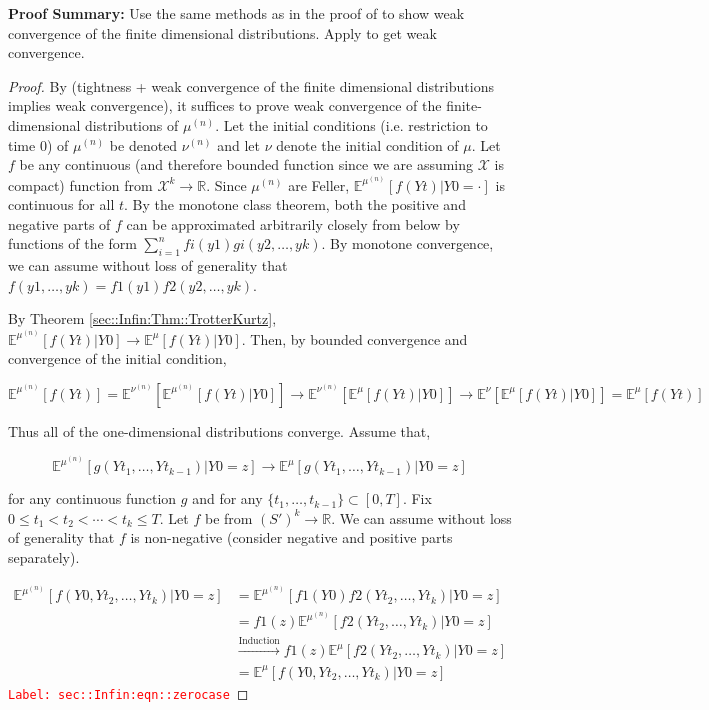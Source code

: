 \documentclass[12pt]{article}
\newcommand{\mb}{\mathbb}
\newcommand{\mc}{\mathcal}
\newcommand{\ra}{\rightarrow}
\newcommand{\os}{\overset}
\newcommand{\te}{\text}
\newcommand{\tr}{\textcolor{red}}
\newcommand{\labe}[1]{\tr{\texttt{Label: #1}}}
\newcommand{\pfsum}{\textbf{Proof Summary: }}
\newcommand{\ind}{\hspace{24pt}}
\newcommand{\exmu}[2]{\mb{E}^{#1}\left[#2\right]}	%
\renewcommand{\t}{t}							%
\newcommand{\sln}[1]{^{(#1)}}						%
\newcommand{\indx}[1]{_{#1}}					%
\newcommand{\m}{\mu}							%
\newcommand{\mm}{\nu}							%
\newcommand{\XX}{Y}								%
\renewcommand{\it}{k}							%
\newcommand{\spce}{\mc{X}}						%
\newcommand{\xx}{y}								%
\newcommand{\xxx}{z}							%
\begin{document}
\pfsum Use the same methods as in the proof of \cite[Theorem 4.2]{Kur81} to show weak convergence of the finite dimensional distributions. Apply \cite[Theorem 13.1]{Bil99} to get weak convergence.

\begin{proof}
By \cite[Theorem 13.1]{Bil99} (tightness + weak convergence of the finite dimensional distributions implies weak convergence), it suffices to prove weak convergence of the finite-dimensional distributions of \(\m\sln{n}\). Let the initial conditions (i.e. restriction to time 0) of \(\m\sln{n}\) be denoted \(\mm\sln{n}\) and let \(\mm\) denote the initial condition of \(\m\). Let \(f\) be any continuous (and therefore bounded function since we are assuming \(\spce\) is compact) function from \(\spce^k\ra\mb{R}\). Since \(\m\sln{n}\) are Feller, \(\exmu{\m\sln{n}}{f(\XX{}{\t})|\XX{}{0} = \cdot}\) is continuous for all \(\t\). By the monotone class theorem, both the positive and negative parts of \(f\) can be approximated arbitrarily closely from below by functions of the form \(\sum_{i=1}^n f{i}(\xx{1})g{i}(\xx{2},\dots,\xx{\it})\). By monotone convergence, we can assume without loss of generality that \(f(\xx{1},\dots,\xx{\it}) = f{1}(\xx{1})f{2}(\xx{2},\dots,\xx{\it})\).

\ind By Theorem \ref{sec::Infin:Thm::TrotterKurtz}, \(\exmu{\m\sln{n}}{f(\XX{}{\t})|\XX{}{0}} \ra \exmu{\m}{f(\XX{}{\t})|\XX{}{0}}\). Then, by bounded convergence and convergence of the initial condition,

\[\exmu{\m\sln{n}}{f(\XX{}{\t})}  = \exmu{\mm\sln{n}}{\exmu{\m\sln{n}}{f(\XX{}{\t})|\XX{}{0}}} \ra \exmu{\mm\sln{n}}{\exmu{\m}{f(\XX{}{\t})|\XX{}{0}}} \ra \exmu{\mm}{\exmu{\m}{f(\XX{}{\t})|\XX{}{0}}} = \exmu{\m}{f(\XX{}{\t})}\]

Thus all of the one-dimensional distributions converge. Assume that,

\[\exmu{\m\sln{n}}{g(\XX{}{\t\indx{1}},\dots,\XX{}{\t\indx{k-1}})|\XX{}{0}=\xxx} \ra \exmu{\m}{g(\XX{}{\t\indx{1}},\dots,\XX{}{\t\indx{k-1}})|\XX{}{0}=\xxx}\]

\noindent for any continuous function \(g\) and for any \(\{\t\indx{1},\dots,\t\indx{k-1}\} \subset [0,T]\). Fix \(0\leq \t\indx{1} <\t\indx{2} <\cdots < \t\indx{\it}\leq T\). Let \(f\) be from \((S')^k \ra \mb{R}\). We can assume without loss of generality that \(f\) is non-negative (consider negative and positive parts separately).

\begin{align}
\exmu{\m\sln{n}}{f(\XX{}{0},\XX{}{\t\indx{2}},\dots,\XX{}{\t\indx{\it}})|\XX{}{0} = \xxx}&= \exmu{\m\sln{n}}{f{1}(\XX{}{0})f{2}(\XX{}{\t\indx{2}},\dots,\XX{}{\t\indx{k}})|\XX{}{0}=\xxx}\nonumber\\
&= f{1}(\xxx)\exmu{\m\sln{n}}{f{2}(\XX{}{\t\indx{2}},\dots,\XX{}{\t\indx{k}})|\XX{}{0}=\xxx}\nonumber\\
&\os{\te{Induction}}{\ra} f{1}(\xxx)\exmu{\m}{f{2}(\XX{}{\t\indx{2}},\dots,\XX{}{\t\indx{k}})|\XX{}{0}=\xxx}\nonumber\\
&= \exmu{\m}{f(\XX{}{0},\XX{}{\t\indx{2}},\dots,\XX{}{\t\indx{\it}})|\XX{}{0}=\xxx}
\label{sec::Infin:eqn::zerocase}
\end{align}
\labe{sec::Infin:eqn::zerocase}


\end{proof}
\end{document}
